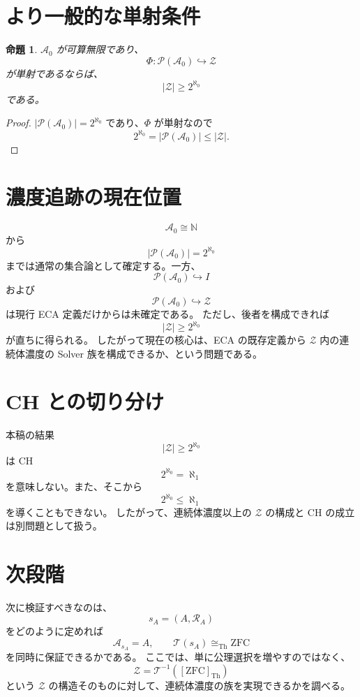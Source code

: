 \documentclass[a4paper,11pt]{article}
\newtheorem{proposition}[definition]{命題}
\newcommand{\Pow}{\mathcal{P}}
\begin{document}
\section{より一般的な単射条件}

\begin{proposition}
$\mathcal{A}_0$ が可算無限であり、
\[
\Phi:\Pow(\mathcal{A}_0)\hookrightarrow\mathcal{Z}
\]
が単射であるならば、
\[
\boxed{|\mathcal{Z}|\geq2^{\aleph_0}}
\]
である。
\end{proposition}

\begin{proof}
$|\Pow(\mathcal{A}_0)|=2^{\aleph_0}$ であり、$\Phi$ が単射なので
\[
2^{\aleph_0}=|\Pow(\mathcal{A}_0)|\leq|\mathcal{Z}|.
\]
\end{proof}

\section{濃度追跡の現在位置}
\[
\mathcal{A}_0\cong\mathbb{N}
\]
から
\[
\boxed{|\Pow(\mathcal{A}_0)|=2^{\aleph_0}}
\]
までは通常の集合論として確定する。一方、
\[
\Pow(\mathcal{A}_0)\hookrightarrow I
\]
および
\[
\Pow(\mathcal{A}_0)\hookrightarrow\mathcal{Z}
\]
は現行 ECA 定義だけからは未確定である。
ただし、後者を構成できれば
\[
\boxed{|\mathcal{Z}|\geq2^{\aleph_0}}
\]
が直ちに得られる。
したがって現在の核心は、ECA の既存定義から $\mathcal{Z}$ 内の連続体濃度の Solver 族を構成できるか、という問題である。

\section{CH との切り分け}
本稿の結果
\[
|\mathcal{Z}|\geq2^{\aleph_0}
\]
は CH
\[
2^{\aleph_0}=\aleph_1
\]
を意味しない。また、そこから
\[
2^{\aleph_0}\leq\aleph_1
\]
を導くこともできない。
したがって、連続体濃度以上の $\mathcal{Z}$ の構成と CH の成立は別問題として扱う。

\section{次段階}
次に検証すべきなのは、
\[
s_A=(A,\mathcal{R}_A)
\]
をどのように定めれば
\[
\mathcal{A}_{s_A}=A,
\qquad
\mathcal{T}(s_A)\cong_{\mathrm{Th}}\mathrm{ZFC}
\]
を同時に保証できるかである。
ここでは、単に公理選択を増やすのではなく、
\[
\mathcal{Z}=\mathcal{T}^{-1}([\mathrm{ZFC}]_{\mathrm{Th}})
\]
という $\mathcal{Z}$ の構造そのものに対して、連続体濃度の族を実現できるかを調べる。
\end{document}
